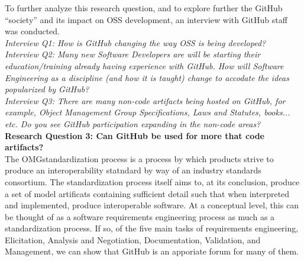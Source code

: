 \documentclass{proc}
\begin{document}
To further analyze this research question, and to explore further the GitHub ``society'' and its impact on OSS development, an interview with GitHub staff was conducted.\\ 
\textit{Interview Q1: How is GitHub changing the way OSS is being developed?}\\

\textit{Interview Q2: Many new Software Developers are will be starting their education/training already having experience with GitHub. How will Software Engineering as a discipline (and how it is taught) change to accodate the ideas popularized by GitHub?}\\

\textit{Interview Q3: There are many non-code artifacts being hosted on GitHub, for example, Object Management Group Specifications, Laws and Statutes, books... etc. Do you see GitHub participation expanding in the non-code areas?}\\

\textbf{Research Question 3: Can GitHub be used for more that code artifacts?}\\
The OMG\textregistered standardization process is a process by which products strive to produce an interoperability statndard by way of an industry standards consortium.\cite{omgTechProcess}
The standardization process itself aims to, at its conclusion, produce a set of model artificats containing sufficient detail such that when interpreted and implemented, produce interoperable software.
At a conceptual level, this can be thought of as a software requirements engineering process as much as a standardization process. If so,  of the five main tasks of requirements engineering, Elicitation, Analysis and Negotiation, Documentation, Validation, and Management,\cite{sommerville1998requirements} we can show that GitHub is an apporiate forum for many of them.\\
\end{document}
